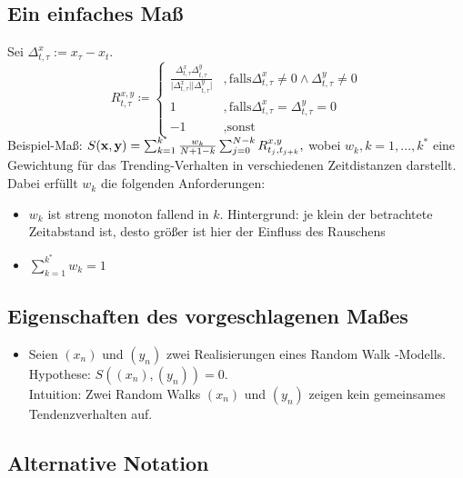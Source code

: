 \documentclass{article}
\theoremstyle{plain}%
\theoremstyle{definition}
\begin{document}
\subsection{Ein einfaches Maß}
Sei $\Delta_{t,\tau}^{x}:=x_\tau-x_t$.
\begin{equation}
  		R_{t,\tau}^{x,y} \coloneqq 
        \begin{cases}
  		    \frac{\Delta_{t,\tau}^{x}\Delta_{t,\tau}^{y}}   {\vert\Delta_{t,\tau}^{x}\vert\vert\Delta_{t,\tau}^{y}\vert } &, \text{falls} \Delta_{t,\tau}^{x}\neq 0 \land \Delta_{t,\tau}^{y}\neq0\\
           1 &, \text{falls} \Delta_{t,\tau}^{x}=\Delta_{t,\tau}^{y}=0\\
            -1 &, \text{sonst} 
  	\end{cases}
	\end{equation}
Beispiel-Maß: $S(\bold{x},\bold{y})=\sum_{k=1}^{k^*}\frac{w_k}{N+1-k}\sum_{j=0}^{N-k}R_{t_j,t_{j+k}}^{x,y},$
wobei $w_k, k=1,...,k^*$ eine Gewichtung für das Trending-Verhalten in verschiedenen Zeitdistanzen darstellt. Dabei erfüllt $w_k$ die folgenden Anforderungen:

\begin{itemize}
    \item $w_k$ ist streng monoton fallend in $k$. Hintergrund: je klein der betrachtete Zeitabstand ist, desto größer ist hier der Einfluss des Rauschens
    \item $\sum_{k=1}^{k^*}w_k=1$
\end{itemize}

\subsection{Eigenschaften des vorgeschlagenen Maßes}
\begin{itemize}
    \item Seien $(x_n)$ und $(y_n)$ zwei Realisierungen eines Random Walk -Modells.\\
    Hypothese: $S((x_n),(y_n))=0$. \\
    Intuition:  Zwei Random Walks $(x_n)$ und $(y_n)$ zeigen kein gemeinsames Tendenzverhalten auf. 
\end{itemize}
 
 \subsection{Alternative Notation}
\end{document}

